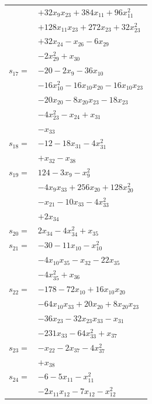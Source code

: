 \begin{longtable}{@{}r@{\;}l@{}}
 & \(\displaystyle +32x_{9}x_{23} +384x_{11} +96x_{11}^{2}\) \\
 & \(\displaystyle +128x_{11}x_{23} +272x_{23} +32x_{23}^{2}\) \\
 & \(\displaystyle +32x_{24} -x_{26} -6x_{29}\) \\
 & \(\displaystyle -2x_{29}^{2} +x_{30}\) \\[3pt]
\(s_{17}=\) & \(\displaystyle -20 -2x_{9} -36x_{10}\) \\
 & \(\displaystyle -16x_{10}^{2} -16x_{10}x_{20} -16x_{10}x_{23}\) \\
 & \(\displaystyle -20x_{20} -8x_{20}x_{23} -18x_{23}\) \\
 & \(\displaystyle -4x_{23}^{2} -x_{24} +x_{31}\) \\
 & \(\displaystyle -x_{33}\) \\[3pt]
\(s_{18}=\) & \(\displaystyle -12 -18x_{31} -4x_{31}^{2}\) \\
 & \(\displaystyle +x_{32} -x_{38}\) \\[3pt]
\(s_{19}=\) & \(\displaystyle 124 -3x_{9} -x_{9}^{2}\) \\
 & \(\displaystyle -4x_{9}x_{33} +256x_{20} +128x_{20}^{2}\) \\
 & \(\displaystyle -x_{21} -10x_{33} -4x_{33}^{2}\) \\
 & \(\displaystyle +2x_{34}\) \\[3pt]
\(s_{20}=\) & \(\displaystyle 2x_{34} -4x_{34}^{2} +x_{35}\) \\[3pt]
\(s_{21}=\) & \(\displaystyle -30 -11x_{10} -x_{10}^{2}\) \\
 & \(\displaystyle -4x_{10}x_{35} -x_{32} -22x_{35}\) \\
 & \(\displaystyle -4x_{35}^{2} +x_{36}\) \\[3pt]
\(s_{22}=\) & \(\displaystyle -178 -72x_{10} +16x_{10}x_{20}\) \\
 & \(\displaystyle -64x_{10}x_{33} +20x_{20} +8x_{20}x_{23}\) \\
 & \(\displaystyle -36x_{23} -32x_{23}x_{33} -x_{31}\) \\
 & \(\displaystyle -231x_{33} -64x_{33}^{2} +x_{37}\) \\[3pt]
\(s_{23}=\) & \(\displaystyle -x_{22} -2x_{37} -4x_{37}^{2}\) \\
 & \(\displaystyle +x_{38}\) \\[3pt]
\(s_{24}=\) & \(\displaystyle -6 -5x_{11} -x_{11}^{2}\) \\
 & \(\displaystyle -2x_{11}x_{12} -7x_{12} -x_{12}^{2}\) \\

\end{longtable}
